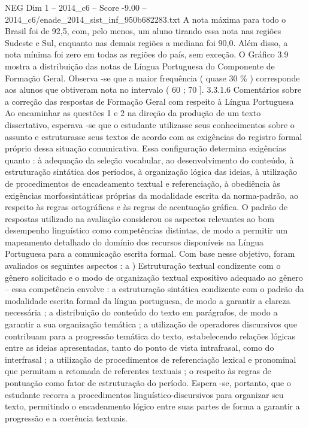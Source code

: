 \begin{textsample}{NEG Dim 1 – 2014\_c6 – Score -9.00 – 2014\_c6/enade\_2014\_sist\_inf\_950b682283.txt}
A nota máxima para todo o Brasil foi de 92,5, com, pelo menos, um aluno tirando essa nota nas regiões Sudeste e Sul, enquanto nas demais regiões a mediana foi 90,0.
Além disso, a nota mínima foi zero em todas as regiões do país, sem exceção.
O Gráfico 3.9 mostra a distribuição das notas de Língua Portuguesa do Componente de Formação Geral.
Observa -se que a maior frequência ( quase 30 \% ) corresponde aos alunos que obtiveram nota no intervalo ( 60 ; 70 ]. 3.3.1.6 Comentários sobre a correção das respostas de Formação Geral com respeito à Língua Portuguesa Ao encaminhar as questões 1 e 2 na direção da produção de um texto dissertativo, esperava -se que o estudante utilizasse seus conhecimentos sobre o assunto e estruturasse seus textos de acordo com as exigências do registro formal próprio dessa situação comunicativa.
Essa configuração determina exigências quanto : à adequação da seleção vocabular, ao desenvolvimento do conteúdo, à estruturação sintática dos períodos, à organização lógica das ideias, à utilização de procedimentos de encadeamento textual e referenciação, à obediência às exigências morfossintáticas próprias da modalidade escrita da norma-padrão, ao respeito às regras ortográficas e às regras de acentuação gráfica.
O padrão de respostas utilizado na avaliação considerou os aspectos relevantes ao bom desempenho linguístico como competências distintas, de modo a permitir um mapeamento detalhado do domínio dos recursos disponíveis na Língua Portuguesa para a comunicação escrita formal.
Com base nesse objetivo, foram avaliados os seguintes aspectos : a ) Estruturação textual condizente com o gênero solicitado e o modo de organização textual expositivo adequado ao gênero – essa competência envolve : a estruturação sintática condizente com o padrão da modalidade escrita formal da língua portuguesa, de modo a garantir a clareza necessária ; a distribuição do conteúdo do texto em parágrafos, de modo a garantir a sua organização temática ; a utilização de operadores discursivos que contribuam para a progressão temática do texto, estabelecendo relações lógicas entre as ideias apresentadas, tanto do ponto de vista intrafrasal, como do interfrasal ; a utilização de procedimentos de referenciação lexical e pronominal que permitam a retomada de referentes textuais ; o respeito às regras de pontuação como fator de estruturação do período.
Espera -se, portanto, que o estudante recorra a procedimentos linguístico-discursivos para organizar seu texto, permitindo o encadeamento lógico entre suas partes de forma a garantir a progressão e a coerência textuais.

\end{textsample}
